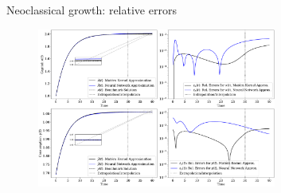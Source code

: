 \documentclass[aspectratio=169,10pt]{beamer}
\begin{document}
\begin{frame}{Neoclassical growth: relative errors}
	\label{errors}
	\begin{figure}[t!]
		\centering
		\includegraphics[width=0.7\textwidth]{figs/neoclassical_growth_model_baseline.pdf}
		\vspace{-4mm}
	\end{figure}
			\hyperlink{ncg:results}{}
\end{frame}
\end{document}
